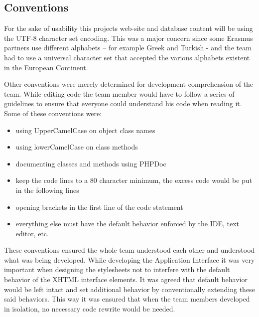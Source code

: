 \subsection{Conventions}

For the sake of usability this projects web-site and database content will be
using the UTF-8 character set encoding. This was a major concern since some
Erasmus partners use different alphabets – for example Greek and Turkish - and
the team had to use a   universal character set that accepted the various
alphabets existent in the European Continent. 

Other conventions were merely determined for development comprehension of the
team. While editing code the team member would have to follow a series of
guidelines to ensure that everyone could understand his code when reading it.
Some of these conventions were:

\begin{itemize}
  \item using UpperCamelCase on object class names 
  \item using lowerCamelCase on class methods
  \item documenting classes and methods using PHPDoc
  \item keep the code lines to a 80 character minimum, the excess code would be
  put in the following lines 
  \item opening brackets in the first line of the code statement
  \item everything else must have the default behavior enforced by the IDE, text
  editor, etc.
\end{itemize}

These conventions ensured the whole team understood each other and understood
what was being developed. While developing the Application Interface it was very important when designing the stylesheets not to interfere with the default behavior of the XHTML interface elements. It was agreed that default behavior would be left intact and set additional behavior by conventionally extending these said behaviors. This way it was ensured that when the team members developed in isolation, no necessary code rewrite would be needed.
